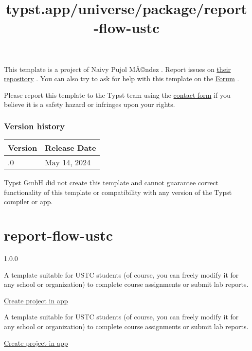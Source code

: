 This template is a project of Naivy Pujol MÃ©ndez . Report issues on
\href{https://github.com/npujol/chuli-cv}{their repository} . You can
also try to ask for help with this template on the
\href{https://forum.typst.app}{Forum} .

Please report this template to the Typst team using the
\href{https://typst.app/contact}{contact form} if you believe it is a
safety hazard or infringes upon your rights.

\label{versions}
\subsubsection{Version history}\label{version-history}

\begin{longtable}[]{@{}ll@{}}
\toprule\noalign{}
Version & Release Date \\
\midrule\noalign{}
\endhead
\bottomrule\noalign{}
\endlastfoot
0.1.0 & May 14, 2024 \\
\end{longtable}

Typst GmbH did not create this template and cannot guarantee correct
functionality of this template or compatibility with any version of the
Typst compiler or app.


\title{typst.app/universe/package/report-flow-ustc}

\label{banner}
\label{template-thumbnail}

\section{report-flow-ustc}\label{report-flow-ustc}

{ 1.0.0 }

A template suitable for USTC students (of course, you can freely modify
it for any school or organization) to complete course assignments or
submit lab reports.

\href{/app?template=report-flow-ustc&version=1.0.0}{Create project in
app}

\label{readme}
A template suitable for USTC students (of course, you can freely modify
it for any school or organization) to complete course assignments or
submit lab reports.

\href{/app?template=report-flow-ustc&version=1.0.0}{Create project in
app}

